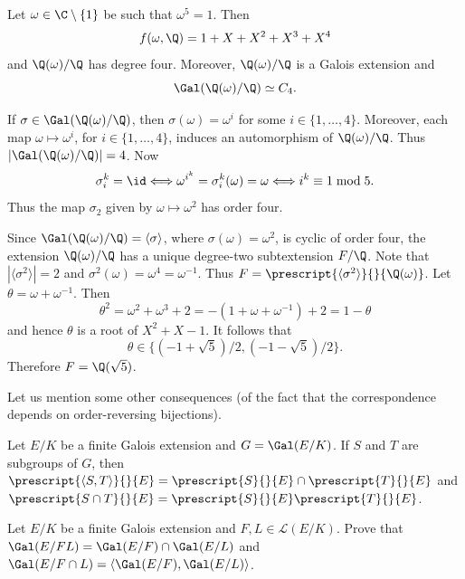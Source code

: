 \begin{example}
    Let $\omega\in\C\setminus\{1\}$ be such that $\omega^5=1$.
    Then 
    \[
    f(\omega,\Q)=1+X+X^2+X^3+X^4
    \]
    and $\Q(\omega)/\Q$ has
    degree four. 
    Moreover, $\Q(\omega)/\Q$ is a Galois extension
    and 
    \[
    \Gal(\Q(\omega)/\Q)\simeq C_4.
    \]
    
    If $\sigma\in \Gal(\Q(\omega)/\Q)$,
    then $\sigma(\omega)=\omega^i$ for some $i\in\{1,\dots,4\}$. 
    Moreover, each  
    map $\omega\mapsto\omega^i$, for $i\in\{1,\dots,4\}$, induces an automorphism
    of $\Q(\omega)/\Q$. Thus $|\Gal(\Q(\omega)/\Q)|=4$. Now 
    \[
    \sigma_i^k=\id\Longleftrightarrow
    \omega^{i^k}=\sigma_i^k(\omega)=\omega\Longleftrightarrow
    i^k\equiv1\bmod 5.
    \]
    Thus the map $\sigma_2$ given 
    by $\omega\mapsto\omega^2$ has order four. 
    
    Since $\Gal(\Q(\omega)/\Q)=\langle\sigma\rangle$,
    where $\sigma(\omega)=\omega^2$, 
    is cyclic of order four, 
    the extension $\Q(\omega)/\Q$ has a unique degree-two 
    subtextension $F/\Q$. Note that $|\langle\sigma^2\rangle|=2$ 
    and $\sigma^2(\omega)=\omega^4=\omega^{-1}$. Thus 
    $F=\prescript{\langle\sigma^2\rangle}{}{\Q(\omega)}$. Let 
    $\theta=\omega+\omega^{-1}$. Then 
    \[
    \theta^2=\omega^2+\omega^3+2=-(1+\omega+\omega^{-1})+2=1-\theta
    \]
    and hence $\theta$ is a root of $X^2+X-1$. It follows that 
    \[
    \theta\in\{(-1+\sqrt{5})/2,(-1-\sqrt{5})/2\}.
    \]
    Therefore
    $F=\Q(\sqrt{5})$. 
\end{example}

Let us mention some other consequences (of the fact that the correspondence 
depends on order-reversing bijections). 

\begin{exercise}
    Let $E/K$ be a finite Galois extension and $G=\Gal(E/K)$. 
    If $S$ and $T$ are subgroups of $G$, then 
    $\prescript{\langle S,T\rangle}{}{E}=\prescript{S}{}{E}\cap \prescript{T}{}{E}$ and 
    $\prescript{S\cap T}{}{E}=\prescript{S}{}{E}\prescript{T}{}{E}$.
\end{exercise}

\begin{exercise}
Let $E/K$ be a finite Galois extension 
and $F,L\in \mathcal{L}(E/K)$. Prove that $\Gal(E/FL)=\Gal(E/F)\cap\Gal(E/L)$ and 
$\Gal(E/F\cap L)=\langle\Gal(E/F),\Gal(E/L)\rangle$.    
\end{exercise}



